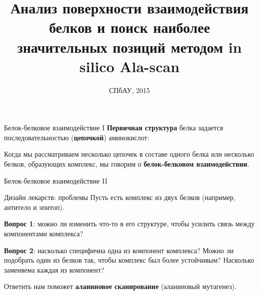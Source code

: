 \documentclass[12pt, xcolor={dvipsnames}]{beamer}
\title[] %
{Анализ поверхности взаимодействия белков и поиск наиболее значительных позиций методом in silico Ala-scan}
\author[] %
{
  \texorpdfstring{
	\begin{columns}
	\column{.55\linewidth}
		Магистрант:\\
		Научный руководитель:
	\column{.45\linewidth}
		Татьяна Малыгина, СПбАУ\\
		Павел Яковлев, BIOCAD
	\end{columns}
   }
   {\& }
}
\date[DIPLOMA 2015] %
{СПбАУ, 2015}
\begin{document}
\begin{frame}
  \titlepage
\end{frame}

\begin{frame}{Белок-белковое взаимодействие I}
\textbf{Первичная структура} белка задается последовательностью (\textbf{цепочкой}) аминокислот:




Когда мы рассматриваем несколько цепочек в составе одного белка или несколько белков, образующих комплекс, мы говорим о \textbf{белок-белковом взаимодействии}.
\end{frame}

\begin{frame}{Белок-белковое взаимодействие II}

\end{frame}

\begin{frame}{Дизайн лекарств: проблемы}
Пусть есть комплекс из двух белков (например, антитело и эпитоп).

\textbf{Вопрос 1}: можно ли изменить что-то в его структуре, чтобы усилить связь между компонентами комплекса?

\textbf{Вопрос 2}: насколько специфична одна из компонент комплекса?  Можно ли подобрать один из белков так, чтобы комплекс был более устойчивым? Насколько заменяема каждая из компонент?

Ответить нам поможет \textbf{аланиновое сканирование} (аланиновый мутагенез).
\end{frame}
\end{document}
